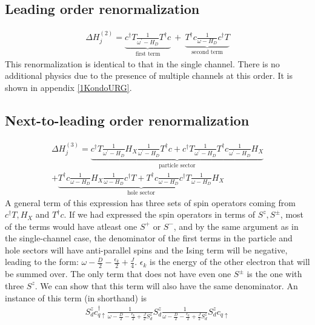 \documentclass[12pt]{revtex4-2}
\begin{document}
\subsection{Leading order renormalization}
\begin{align}
	\Delta H^{(2)}_j = \underbrace{c^\dagger T \frac{1}{\omega^\prime - H_D}T^\dagger c}_\text{first term}~+~\underbrace{T^\dagger c \frac{1}{\omega - H_D}c^\dagger T}_\text{second term}
\end{align}
This renormalization is identical to that in the single channel. There is no additional physics due to the presence of multiple channels at this order. It is shown in appendix \ref{1KondoURG}.

\subsection{Next-to-leading order renormalization}
\begin{align}
	\label{3rd_oder_terms}
	\Delta H^{(3)}_j = \underbrace{c^\dagger T \frac{1}{\omega^\prime - H_D} H_X \frac{1}{\omega^\prime - H_D} T^\dagger c + c^\dagger T \frac{1}{\omega^\prime - H_D} T^\dagger c \frac{1}{\omega^\prime - H_D} H_X}_\text{particle sector}\nonumber\\
	+ \underbrace{T^\dagger c \frac{1}{\omega - H_D} H_X \frac{1}{\omega - H_D} c^\dagger T + T^\dagger c \frac{1}{\omega - H_D} c^\dagger T \frac{1}{\omega - H_D} H_X}_\text{hole sector}
\end{align}
A general term of this expression has three sets of spin operators coming from \(c^\dagger T, H_X\) and \(T^\dagger c\). If we had expressed the spin operators in terms of \(S^z, S^\pm\), most of the terms would have atleast one \(S^+\) or \(S^-\), and by the same argument as in the single-channel case, the denominator of the first terms in the particle and hole sectors will have anti-parallel spins and the Ising term will be negative, leading to the form: \(\omega - \frac{D}{2} -  \frac{\epsilon_k}{2} + \frac{J}{4}\). \(\epsilon_k\) is the energy of the other electron that will be summed over. The only term that does not have even one \(S^\pm\) is the one with three \(S^z\). We can show that this term will also have the same denominator. An instance of this term (in shorthand) is
\begin{align}
	S_d^z c^\dagger_{q \uparrow} \frac{1}{\omega - \frac{D}{2} - \frac{\epsilon_k}{2} + \frac{J}{2} S_d^z} S_d^z \frac{1}{\omega - \frac{D}{2} - \frac{\epsilon_k}{2} + \frac{J}{2} S_d^z} S_d^z c_{q \uparrow}\\
\end{align}
\end{document}
